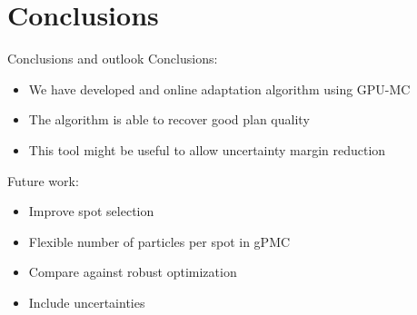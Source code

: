 \section{Conclusions}
\begin{frame}[c]{Conclusions and outlook}
    Conclusions:
	\begin{itemize}
		\item We have developed and online adaptation algorithm using GPU-MC
		\item The algorithm is able to recover good plan quality
		\item This tool might be useful to allow uncertainty margin reduction
	\end{itemize}
	\pause
	Future work:
    \begin{itemize}
        \item Improve spot selection
        \item Flexible number of particles per spot in gPMC
        \item Compare against robust optimization
        \item Include uncertainties
    \end{itemize}
\end{frame}
